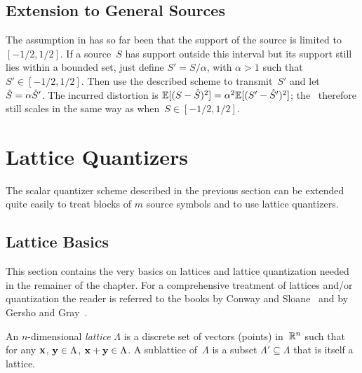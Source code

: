 


\subsection{Extension to General Sources}

The assumption in  has so far been that the support of the
source is limited to~$[-1/2,1/2]$. If a source~$S$ has support outside this
interval but its support still lies within a bounded set, just define $S' =
S/\alpha$, with $\alpha > 1$ such that $S' \in [-1/2, 1/2]$. Then use
the described scheme to transmit~$S'$ and let ${\hat{S}} = \alpha {\hat{S}}'$. The
incurred distortion is $\mathbb{E}[(S - {\hat{S}})^2] = \alpha^2 \mathbb{E}[(S' - {\hat{S}}')^2]$; the \sdr\
therefore still scales in the same way as when~$S \in [-1/2, 1/2]$.



\section{Lattice Quantizers}\label{sec:latticequant}

The scalar quantizer scheme described in the previous section can be extended
quite easily to treat blocks of $m$ source symbols and to use lattice
quantizers. 


\subsection{Lattice Basics}

This section contains the very basics on lattices and lattice quantization
needed in the remainer of the chapter. For a comprehensive treatment of lattices
and/or quantization the reader is referred to the books by Conway and
Sloane~\cite{ConwayS1988} and by Gersho and Gray~\cite{GershoG1992}.

\begin{definition}
  An $n$-dimensional \emph{lattice} $\Lambda$ is a discrete set of vectors
  (points) in~$\mathbb{R}^n$ such that for any $\mathbf{x}$, $\mathbf{y} \in \Lambda$, $\mathbf{x} + \mathbf{y} \in
  \Lambda$. A sublattice of~$\Lambda$ is a subset $\Lambda' \subseteq \Lambda$
  that is itself a lattice. 
\end{definition}

